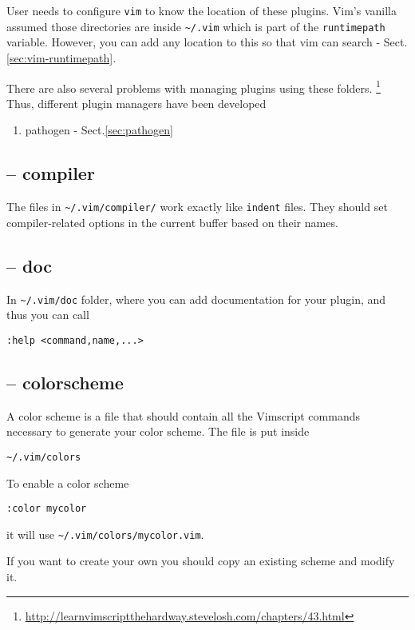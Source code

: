User needs to configure \verb!vim! to know the location of these plugins.
Vim's vanilla assumed those directories are inside \verb!~/.vim! which is part
of the \verb!runtimepath! variable. However, you can add any location to this so
that vim can search - Sect.\ref{sec:vim-runtimepath}.

There are also several problems with managing plugins using these folders.
\footnote{\url{http://learnvimscriptthehardway.stevelosh.com/chapters/43.html}}
 Thus, different plugin managers have been developed
\begin{enumerate}
  \item pathogen - Sect.\ref{sec:pathogen}
\end{enumerate}



\subsection{-- compiler}
\label{sec:vim-compiler}

The files in \verb!~/.vim/compiler/! work exactly like \verb!indent! files. They
should set compiler-related options in the current buffer based on their names.


\subsection{-- doc}
\label{sec:vim-doc}

In \verb!~/.vim/doc! folder, where you can add documentation for your plugin,
and thus you can call
\begin{verbatim}
:help <command,name,...>
\end{verbatim}


\subsection{-- colorscheme}
\label{sec:vim-colorscheme}  

A color scheme is a file that should contain all the Vimscript commands
necessary to generate your color scheme. The file is put inside
\begin{verbatim}
~/.vim/colors
\end{verbatim}

To enable a color scheme
\begin{verbatim}
:color mycolor
\end{verbatim}
it will use \verb!~/.vim/colors/mycolor.vim!. 

If you want to create your own you should copy an existing scheme and modify
it.



